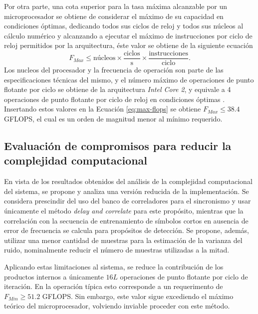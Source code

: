 Por otra parte, una cota superior para la tasa máxima alcanzable por un microprocesador se obtiene de considerar el máximo de su capacidad en condiciones óptimas, dedicando todos sus ciclos de reloj y todos sus núcleos al cálculo numérico y alcanzando a ejecutar el máximo de instrucciones por ciclo de reloj permitidos por la arquitectura, éste valor se obtiene de la siguiente ecuación
\begin{equation}\label{eq:max-flops}
    F_{Max} \le \text{núcleos} \times \frac{\text{ciclos}}{\text{s}}\times\frac{\text{instrucciones}}{\text{ciclo}}.
\end{equation}
Los nucleos del procesador y la frecuencia de operación son parte de las especificaciones técnicas del mismo, y el número máximo de operaciones de punto flotante por ciclo se obtiene de la arquitectura \textit{Intel Core 2}, y equivale a 4 operaciones de punto flotante por ciclo de reloj en condiciones óptimas \cite{fog}. Insertando estos valores en la Ecuación \ref{eq:max-flops} se obtiene $F_{Max}\le 38.4$ GFLOPS, el cual es un orden de magnitud menor al mínimo requerido.

\subsection{Evaluación de compromisos para reducir la complejidad computacional}

En vista de los resultados obtenidos del análisis de la complejidad computacional del sistema, se propone y analiza una versión reducida de la implementación. Se considera prescindir del uso del banco de correladores para el sincronismo y usar únicamente el método \textit{delay and correlate} para este propósito, mientras que la correlación con la secuencia de entrenamiento de símbolos cortos en ausencia de error de frecuencia se calcula para propósitos de detección. Se propone, además, utilizar una menor cantidad de muestras para la estimación de la varianza del ruido, nominalmente reducir el número de muestras utilizadas a la mitad. 

Aplicando estas limitaciones al sistema, se reduce la contribución de los productos internos a únicamente $16L$ operaciones de punto flotante por ciclo de iteración. En la operación típica esto corresponde a un requerimento de $F_{Min} \ge 51.2$ GFLOPS. Sin embargo, este valor sigue excediendo el máximo teórico del microprocesador, volviendo inviable proceder con este método.


\color{black}

